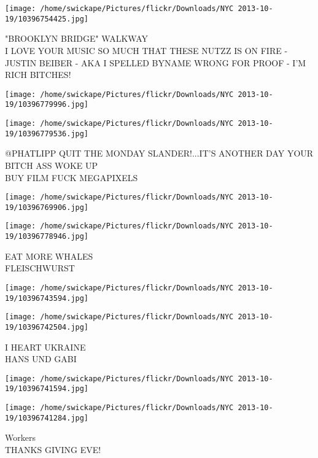 \documentclass[10pt,letterpaper]{article}
\begin{document}
\vspace{0.25in}
\texttt{[image: /home/swickape/Pictures/flickr/Downloads/NYC 2013-10-19/10396754425.jpg]}

"BROOKLYN BRIDGE" WALKWAY\\
I LOVE YOUR MUSIC SO MUCH THAT THESE NUTZZ IS ON FIRE {-} JUSTIN BEIBER {-} AKA I SPELLED BYNAME WRONG FOR PROOF {-} I'M RICH BITCHES!\\
\pagebreak

\texttt{[image: /home/swickape/Pictures/flickr/Downloads/NYC 2013-10-19/10396779996.jpg]}

\vspace{0.25in}
\texttt{[image: /home/swickape/Pictures/flickr/Downloads/NYC 2013-10-19/10396779536.jpg]}

@PHATLIPP QUIT THE MONDAY SLANDER!...IT'S ANOTHER DAY YOUR BITCH ASS WOKE UP\\
BUY FILM FUCK MEGAPIXELS\\
\pagebreak

\texttt{[image: /home/swickape/Pictures/flickr/Downloads/NYC 2013-10-19/10396769906.jpg]}

\vspace{0.25in}
\texttt{[image: /home/swickape/Pictures/flickr/Downloads/NYC 2013-10-19/10396778946.jpg]}

EAT MORE WHALES\\
FLEISCHWURST\\
\pagebreak

\texttt{[image: /home/swickape/Pictures/flickr/Downloads/NYC 2013-10-19/10396743594.jpg]}

\vspace{0.25in}
\texttt{[image: /home/swickape/Pictures/flickr/Downloads/NYC 2013-10-19/10396742504.jpg]}

I HEART UKRAINE\\
HANS UND GABI\\
\pagebreak

\texttt{[image: /home/swickape/Pictures/flickr/Downloads/NYC 2013-10-19/10396741594.jpg]}

\vspace{0.25in}
\texttt{[image: /home/swickape/Pictures/flickr/Downloads/NYC 2013-10-19/10396741284.jpg]}

Workers\\
THANKS GIVING EVE!\\
\pagebreak
\end{document}
